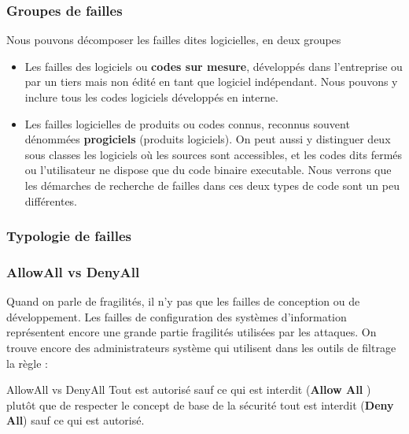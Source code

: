\begin{frame}
\frametitle<presentation>{Groupes de failles}
Nous pouvons décomposer les failles dites logicielles, en deux groupes 
\begin{itemize}
\item Les failles des logiciels ou \textbf{codes sur mesure}, développés dans l'entreprise ou par un tiers mais non édité en tant que logiciel indépendant. Nous pouvons y inclure tous les codes logiciels développés en interne.
\item Les failles logicielles de produits ou codes connus, reconnus souvent dénommées \textbf{progiciels} (produits logiciels). On peut aussi y distinguer deux sous classes les logiciels où les sources sont accessibles, et les codes dits fermés ou l'utilisateur ne dispose que du code binaire executable. Nous verrons que les démarches de recherche de failles dans ces deux types de code sont un peu différentes.
\end{itemize}

\end{frame}


\begin{frame}
\frametitle<presentation>{Typologie de failles}
\end{frame}

\begin{frame}
\frametitle<presentation>{AllowAll vs DenyAll}
Quand on parle de fragilités, il n'y pas que les failles de conception ou de développement. Les failles de configuration des systèmes d'information représentent encore une grande partie fragilités utilisées par les attaques.
On trouve encore des administrateurs système qui utilisent dans les outils de filtrage la règle :

\begin{notebox}{AllowAll vs DenyAll}
Tout est autorisé sauf ce qui est interdit (\textbf{Allow All })
plutôt que de respecter le concept de base de la sécurité 
tout est interdit (\textbf{Deny All}) sauf ce qui est autorisé.
\end{notebox}

\end{frame}


